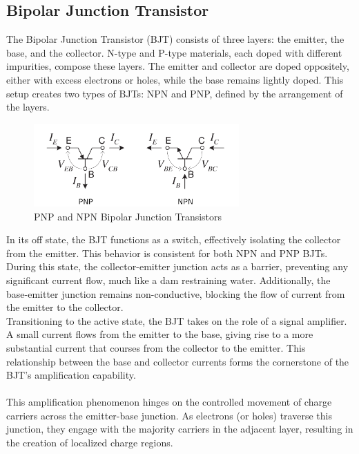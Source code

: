     \subsection{Bipolar Junction Transistor}
        The Bipolar Junction Transistor (BJT) consists of three layers: the emitter, the base, and the collector. 
        N-type and P-type materials, each doped with different impurities, compose these layers. 
        The emitter and collector are doped oppositely, either with excess electrons or holes, while the base remains lightly doped. 
        This setup creates two types of BJTs: NPN and PNP, defined by the arrangement of the layers.
        \begin{figure}[H]
            \centering
            \includegraphics[width=0.7\textwidth]{figures/PNP_NPN.png}
            \caption{PNP and NPN Bipolar Junction Transistors}
            \label{fig:PNP_NPN}
        \end{figure}
        \noindent
        In its off state, the BJT functions as a switch, effectively isolating the collector from the emitter. 
        This behavior is consistent for both NPN and PNP BJTs. During this state, the collector-emitter junction acts as a barrier, preventing any significant current flow, much like a dam restraining water. 
        Additionally, the base-emitter junction remains non-conductive, blocking the flow of current from the emitter to the collector. \\
        Transitioning to the active state, the BJT takes on the role of a signal amplifier. A small current flows from the emitter to the base, giving rise to a more substantial current that courses from the collector to the emitter. 
        This relationship between the base and collector currents forms the cornerstone of the BJT's amplification capability. \\\\
        This amplification phenomenon hinges on the controlled movement of charge carriers across the emitter-base junction. 
        As electrons (or holes) traverse this junction, they engage with the majority carriers in the adjacent layer, resulting in the creation of localized charge regions. 
